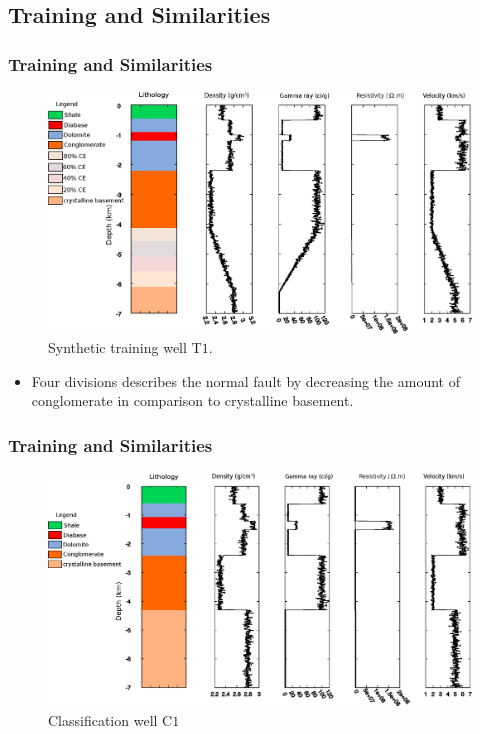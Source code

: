 \documentclass[aspectratio=10]{beamer} %
\begin{document}
\subsection{Training and Similarities}

\begin{frame}
	\frametitle{Training and Similarities}
	\begin{figure}[H]
		\centering
		\includegraphics[scale=0.34]{Imagens/Pocot1.eps}
		\caption{Synthetic training well T$1$.}
		\label{T1}
	\end{figure}
\pause
\begin{itemize}\footnotesize
	\item Four divisions describes the normal fault by decreasing the amount of conglomerate in comparison to crystalline basement.
\end{itemize}

\end{frame}

\begin{frame}
\frametitle{Training and Similarities}
\begin{figure}[H]
	\centering
	\includegraphics[scale=0.39]{Imagens/Pococ1.eps}
	\caption{Classification well C$1$}
	\label{C1}
\end{figure}
\end{frame}
\end{document}
